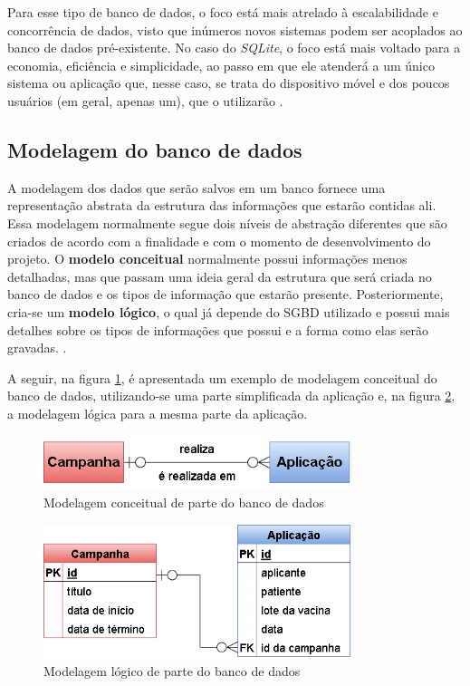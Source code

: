 Para esse tipo de banco de dados, o foco está mais atrelado à escalabilidade e concorrência de dados, visto que inúmeros novos sistemas podem ser acoplados ao banco de dados pré-existente. No caso do \textit{SQLite}, o foco está mais voltado para a economia, eficiência e simplicidade, ao passo em que ele atenderá a um único sistema ou aplicação que, nesse caso, se trata do dispositivo móvel e dos poucos usuários (em geral, apenas um), que o utilizarão \cite{sqlite_use}.

\subsection{Modelagem do banco de dados}
\label{Sec:ModelagemBD}

A modelagem dos dados que serão salvos em um banco fornece uma representação abstrata da estrutura das informações que estarão contidas ali. Essa modelagem normalmente segue dois níveis de abstração diferentes que são criados de acordo com a finalidade e com o momento de desenvolvimento do projeto. O \textbf{modelo conceitual} normalmente possui informações menos detalhadas, mas que passam uma ideia geral da estrutura que será criada no banco de dados e os tipos de informação que estarão presente. Posteriormente, cria-se um \textbf{modelo lógico}, o qual já depende do SGBD utilizado e possui mais detalhes sobre os tipos de informações que possui e a forma como elas serão gravadas. \cite{heuser09banco}.

A seguir, na figura \ref{fig:diagrama_er}, é apresentada um exemplo de modelagem conceitual do banco de dados, utilizando-se uma parte simplificada da aplicação e, na figura \ref{fig:diagrama_logico}, a modelagem lógica para a mesma parte da aplicação.

\begin{figure}[!ht]
    \centering
    \includegraphics[width=0.8\textwidth]{figuras/cap2/2_3_2_diagrama-er.png}
    \caption{Modelagem conceitual de parte do banco de dados}
    \label{fig:diagrama_er}
\end{figure}

\begin{figure}[!ht]
    \centering
    \includegraphics[width=0.8\textwidth]{figuras/cap2/2_3_2_diagrama-logico.png}
    \caption{Modelagem lógico de parte do banco de dados}
    \label{fig:diagrama_logico}
\end{figure}

